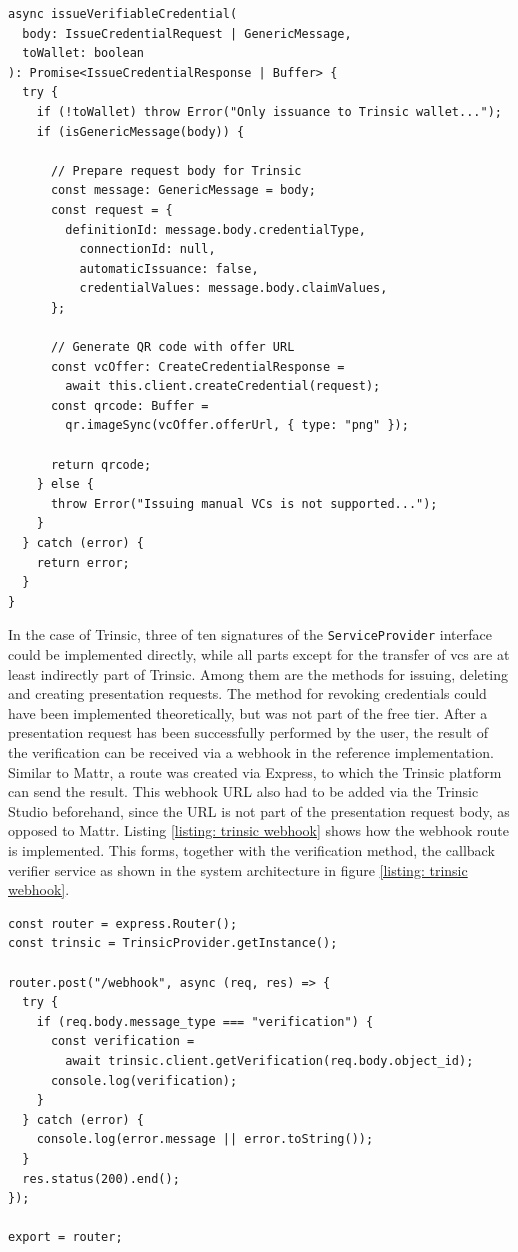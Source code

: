     \begin{lstlisting}[style=ES6, caption=\ac{vc} issuance with Trinsic, label={listing: trinsic issuance}]
async issueVerifiableCredential(
  body: IssueCredentialRequest | GenericMessage,
  toWallet: boolean
): Promise<IssueCredentialResponse | Buffer> {
  try {
    if (!toWallet) throw Error("Only issuance to Trinsic wallet...");
    if (isGenericMessage(body)) {
    
      // Prepare request body for Trinsic
      const message: GenericMessage = body;
      const request = {
        definitionId: message.body.credentialType,
          connectionId: null,
          automaticIssuance: false,
          credentialValues: message.body.claimValues,
      };
      
      // Generate QR code with offer URL
      const vcOffer: CreateCredentialResponse = 
        await this.client.createCredential(request);
      const qrcode: Buffer = 
        qr.imageSync(vcOffer.offerUrl, { type: "png" });
        
      return qrcode;
    } else {
      throw Error("Issuing manual VCs is not supported...");
    }
  } catch (error) {
    return error;
  }
}\end{lstlisting}

    In the case of Trinsic, three of ten signatures of the \texttt{ServiceProvider} interface could be implemented directly, while all parts except for the transfer of \acp{vc} are at least indirectly part of Trinsic. Among them are the methods for issuing, deleting and creating presentation requests. The method for revoking credentials could have been implemented theoretically, but was not part of the free tier. After a presentation request has been successfully performed by the user, the result of the verification can be received via a webhook in the reference implementation. Similar to Mattr, a route was created via Express, to which the Trinsic platform can send the result. This webhook URL also had to be added via the Trinsic Studio beforehand, since the URL is not part of the presentation request body, as opposed to Mattr. Listing \ref{listing: trinsic webhook} shows how the webhook route is implemented. This forms, together with the verification method, the callback verifier service as shown in the system architecture in figure \ref{listing: trinsic webhook}.
    \newline
    
    \begin{lstlisting}[style=ES6, caption=Trinsic webhook for verification result, label={listing: trinsic webhook}]
const router = express.Router();
const trinsic = TrinsicProvider.getInstance();

router.post("/webhook", async (req, res) => {
  try {
    if (req.body.message_type === "verification") {
      const verification = 
        await trinsic.client.getVerification(req.body.object_id);
      console.log(verification);
    }
  } catch (error) {
    console.log(error.message || error.toString());
  }
  res.status(200).end();
});

export = router;
\end{lstlisting}


